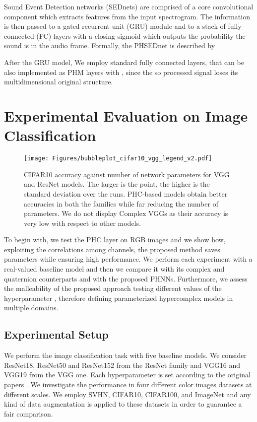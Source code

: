 \documentclass[lettersize,journal]{IEEEtran}
\begin{document}
Sound Event Detection networks (SEDnets) \cite{Adavanne2019SoundEL} are comprised of a core convolutional component which extracts features from the input spectrogram. The information is then passed to a gated recurrent unit (GRU) module and to a stack of fully connected (FC) layers with a closing sigmoid  which outputs the probability the sound is in the audio frame. Formally, the PHSEDnet is described by

After the GRU model, We employ standard fully connected layers, that can be also implemented as PHM layers with , since the so processed signal loses its multidimensional original structure.












\section{Experimental Evaluation on Image Classification}
\label{sec:img_class}

\begin{figure}[t]
    \centering
    \texttt{[image: Figures/bubbleplot\_cifar10\_vgg\_legend\_v2.pdf]}
    \caption{CIFAR10 accuracy against number of network parameters for VGG and ResNet models. The larger is the point, the higher is the standard deviation over the runs. PHC-based models obtain better accuracies in both the families while far reducing the number of parameters. We do not display Complex VGGs as their accuracy is very low with respect to other models.}
    \label{fig:bubble}
\end{figure}

To begin with, we test the PHC layer on RGB images and we show how, exploiting the correlations among channels, the proposed method saves parameters while ensuring high performance. We perform each experiment with a real-valued baseline model and then we compare it with its complex and quaternion counterparts and with the proposed PHNNs. Furthermore, we assess the malleability of the proposed approach testing different values of the hyperparameter , therefore defining parameterized hypercomplex models in multiple domains.

\subsection{Experimental Setup}
We perform the image classification task with five baseline models. We consider ResNet18, ResNet50 and ResNet152 from the ResNet family and VGG16 and VGG19 from the VGG one. Each hyperparameter is set according to the original papers \cite{Resnet2016, VGG2015}. We investigate the performance in four different color images datasets at different scales. We employ SVHN, CIFAR10, CIFAR100, and ImageNet and any kind of data augmentation is applied to these datasets in order to guarantee a fair comparison.
\end{document}
